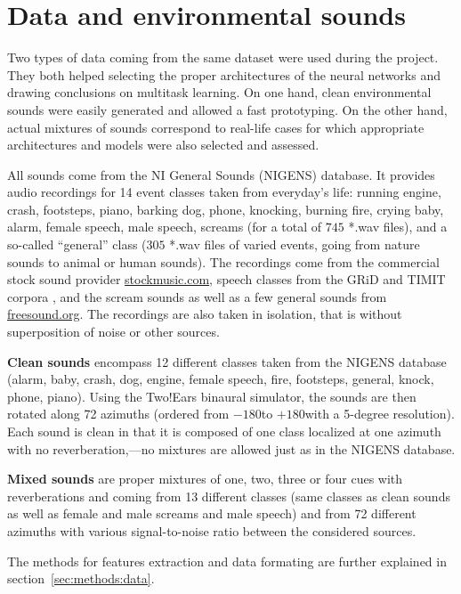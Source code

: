 \section{Data and environmental sounds}
\label{sec:introduction:data}

Two types of data coming from the same dataset were used during the project. They both helped selecting the proper architectures of the neural networks and drawing conclusions on multitask learning. On one hand, clean environmental sounds were easily generated and allowed a fast prototyping. On the other hand, actual mixtures of sounds correspond to real-life cases for which appropriate architectures and models were also selected and assessed.

All sounds come from the NI General Sounds (NIGENS) database. It provides audio recordings for 14 event classes taken from everyday's life: running engine, crash, footsteps, piano, barking dog, phone, knocking, burning fire, crying baby, alarm, female speech, male speech, screams (for a total of $745$ *.wav files), and a so-called ``general'' class ($305$ *.wav files of varied events, going from nature sounds to animal or human sounds). The recordings come from the commercial stock sound provider \url{stockmusic.com}, speech classes from the GRiD and TIMIT corpora \parencite{Cooke2006audio,garofolo1993timit}, and the scream sounds as well as a few general sounds from \url{freesound.org}. The recordings are also taken in isolation, that is without superposition of noise or other sources.

\textbf{Clean sounds} encompass 12 different classes taken from the NIGENS database (alarm, baby, crash, dog, engine, female speech, fire, footsteps, general, knock, phone, piano). Using the Two!Ears binaural simulator, the sounds are then rotated along 72 azimuths (ordered from $-180$\textdegree to $+180$\textdegree with a 5-degree resolution). Each sound is clean in that it is composed of one class localized at one azimuth with no reverberation,---no mixtures are allowed just as in the NIGENS database.

\textbf{Mixed sounds} are proper mixtures of one, two, three or four cues with reverberations and coming from 13 different classes (same classes as clean sounds as well as female and male screams and male speech) and from 72 different azimuths with various signal-to-noise ratio between the considered sources.

The methods for features extraction and data formating are further explained in section~\ref{sec:methods:data}.


